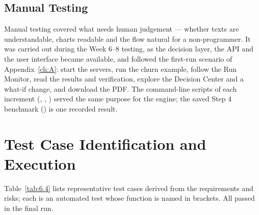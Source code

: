 \subsection{Manual Testing}\label{sec:6.2.4}

Manual testing covered what needs human judgement --- whether texts are understandable, charts readable and the flow natural for a non-programmer. It was carried out during the Week 6--8 testing, as the decision layer, the API and the user interface became available, and followed the first-run scenario of Appendix~\ref{ch:A}: start the servers, run the churn example, follow the Run Monitor, read the results and verification, explore the Decision Center and a what-if change, and download the PDF. The command-line scripts of each increment (, , ) served the same purpose for the engine; the saved Step 4 benchmark () is one recorded result.

\FloatBarrier
\section{Test Case Identification and Execution}\label{sec:6.3}

Table~\ref{tab:6.4} lists representative test cases derived from the requirements and risks; each is an automated test whose function is named in brackets. All passed in the final run.


